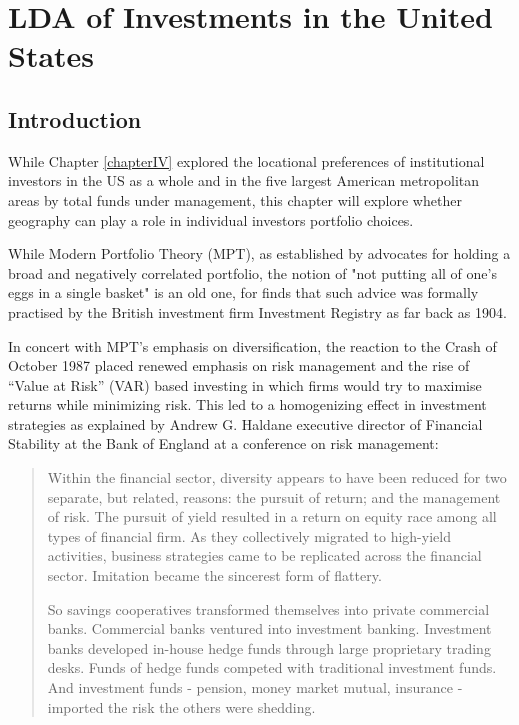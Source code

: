 \chapter{LDA of Investments in the United States} 
\section{Introduction}
\nocite{tmpackage} \nocite{LDAvis} \nocite{Stargazer}

While Chapter \ref{chapterIV} explored the locational preferences of institutional investors in the US as a whole and in the five largest American metropolitan areas by total funds under management, this chapter will explore whether geography can play a role in individual investors portfolio choices.   

While Modern Portfolio Theory (MPT), as established by \cite{Markowitz1952} advocates for holding a broad and negatively correlated portfolio, the notion of "not putting all of one's eggs in a single basket" is an old one, for \cite{Lofthouse53} finds that such advice was formally practised by the British investment firm Investment Registry as far back as 1904.  

In concert with MPT's emphasis on diversification, the reaction to the Crash of October 1987 placed renewed emphasis on risk management and the rise of ``Value at Risk'' (VAR) based investing in which firms would try to maximise returns while minimizing risk.  This led to a homogenizing effect in investment strategies as explained by Andrew G. Haldane executive director of Financial Stability at the Bank of England at a conference on risk management:

\begin{quote}
	Within the financial sector, diversity appears to have been reduced for two separate, but related, reasons:  the pursuit of return;  and the management of risk.  The pursuit of yield resulted in a return on equity race among all types of financial firm.  As they collectively migrated to high-yield activities, business strategies came to be replicated across the financial sector.  Imitation became the sincerest form of flattery.
	
	So savings cooperatives transformed themselves into private commercial banks.  Commercial banks ventured into investment banking.  Investment banks developed in-house hedge funds through large proprietary trading desks.  Funds of hedge funds competed with traditional investment funds.  And investment funds - pension, money market mutual, insurance - imported the risk the others were shedding.   \citep[p.18]{Haldane2009}
\end{quote} 

